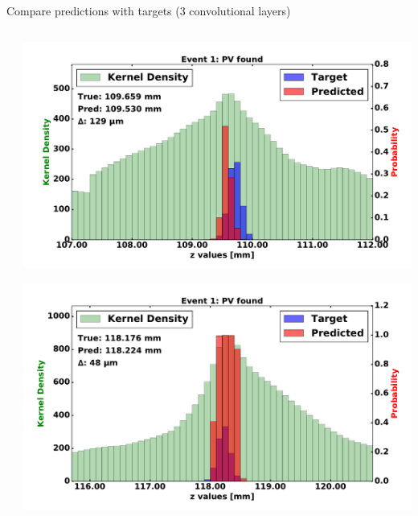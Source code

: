 \begin{frame}{Compare predictions with targets (3 convolutional layers)}
\begin{columns}[c]
\begin{center}
        \end{center}
        \begin{center}
           \includegraphics[width=1\textwidth, height=0.45\textwidth, trim=18 0 18 0]{images/120000_3layer_06.pdf}

           \includegraphics[width=1\textwidth, height=0.45\textwidth, trim=18 0 18 0]{images/120000_3layer_07.pdf}
       \end{center}
  \end{columns}
\end{frame}

